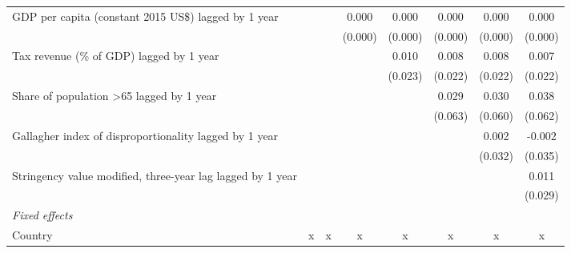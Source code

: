 \begin{tabular}{lccccccc}
   GDP per capita (constant 2015 US\$) lagged by 1 year                                     &                &                & 0.000          & 0.000          & 0.000          & 0.000          & 0.000\\   
                                                                                            &                &                & (0.000)        & (0.000)        & (0.000)        & (0.000)        & (0.000)\\   
   Tax revenue (\% of GDP) lagged by 1 year                                                 &                &                &                & 0.010          & 0.008          & 0.008          & 0.007\\   
                                                                                            &                &                &                & (0.023)        & (0.022)        & (0.022)        & (0.022)\\   
   Share of population >65 lagged by 1 year                                                 &                &                &                &                & 0.029          & 0.030          & 0.038\\   
                                                                                            &                &                &                &                & (0.063)        & (0.060)        & (0.062)\\   
   Gallagher index of disproportionality lagged by 1 year                                   &                &                &                &                &                & 0.002          & -0.002\\   
                                                                                            &                &                &                &                &                & (0.032)        & (0.035)\\   
   Stringency value modified, three-year lag lagged by 1 year                               &                &                &                &                &                &                & 0.011\\   
                                                                                            &                &                &                &                &                &                & (0.029)\\   
   \emph{Fixed effects}\\
   Country                                                                                  & x              & x              & x              & x              & x              & x              & x\\  

\end{tabular}
